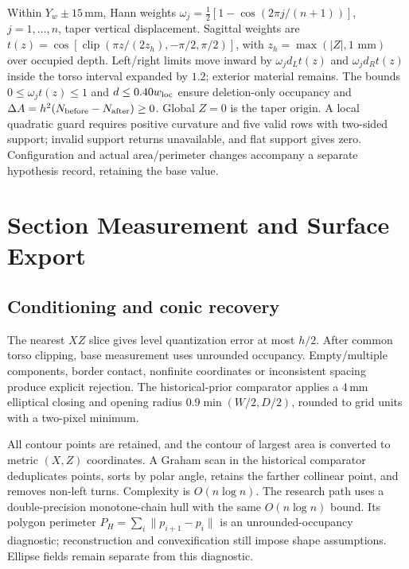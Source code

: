 \documentclass[11pt,a4paper]{article}
\newcommand{\clip}{\operatorname{clip}}
\begin{document}
Within $Y_w\pm15$\,mm, Hann weights $\omega_j=\tfrac12[1-\cos(2\pi j/(n+1))]$, $j=1,\ldots,n$, taper vertical displacement. Sagittal weights are $t(z)=\cos[\clip(\pi z/(2z_h),-\pi/2,\pi/2)]$, with $z_h=\max(|Z|,1\text{ mm})$ over occupied depth. Left/right limits move inward by $\omega_jd_Lt(z)$ and $\omega_jd_Rt(z)$ inside the torso interval expanded by $1.2$; exterior material remains. The bounds $0\leq\omega_jt(z)\leq1$ and $d\leq0.40w_{\rm loc}$ ensure deletion-only occupancy and $\Delta A=h^2(N_{\rm before}-N_{\rm after})\geq0$. Global $Z=0$ is the taper origin. A local quadratic guard requires positive curvature and five valid rows with two-sided support; invalid support returns unavailable, and flat support gives zero. Configuration and actual area/perimeter changes accompany a separate hypothesis record, retaining the base value.

\section{Section Measurement and Surface Export}
\subsection{Conditioning and conic recovery}
The nearest $XZ$ slice gives level quantization error at most $h/2$. After common torso clipping, base measurement uses unrounded occupancy. Empty/multiple components, border contact, nonfinite coordinates or inconsistent spacing produce explicit rejection. The historical-prior comparator applies a 4\,mm elliptical closing and opening radius $0.9\min(W/2,D/2)$, rounded to grid units with a two-pixel minimum.

All contour points are retained, and the contour of largest area is converted to metric $(X,Z)$ coordinates. A Graham scan in the historical comparator~\cite{graham1972efficient} deduplicates points, sorts by polar angle, retains the farther collinear point, and removes non-left turns. Complexity is $O(n\log n)$. The research path uses a double-precision monotone-chain hull with the same $O(n\log n)$ bound. Its polygon perimeter $P_H=\sum_i\|p_{i+1}-p_i\|$ is an unrounded-occupancy diagnostic; reconstruction and convexification still impose shape assumptions. Ellipse fields remain separate from this diagnostic.
\end{document}
